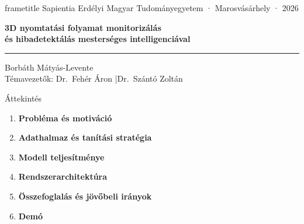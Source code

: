 \documentclass[aspectratio=169]{beamer}
\begin{document}
{
\begin{frame}[plain]
  \begin{beamercolorbox}[wd=\paperwidth,ht=1.3cm,dp=0pt,center]{frametitle}
    \vspace{0.35cm}
    {\small\color{white}
      Sapientia Erdélyi Magyar Tudományegyetem · Marosvásárhely · 2026}
  \end{beamercolorbox}

  \vspace{1.6cm}
  \centering
  {\LARGE\bfseries\color{primary}
    3D nyomtatási folyamat monitorizálás\\[0.45em]
    és hibadetektálás mesterséges intelligenciával}

  \vspace{0.9em}
  {\color{primary}\rule{9cm}{0.5pt}}
  \vspace{0.9em}

  {\large\color{black!75} Borbáth Mátyás-Levente}\\[0.5em]
  {\small\color{black!50}
    Témavezetők: Dr.~Fehér Áron \quad|\quad Dr.~Szántó Zoltán}
\end{frame}
}

\begin{frame}{Áttekintés}
  \vspace{0.6em}
  \centering
  \begin{minipage}{0.72\textwidth}
    \begin{enumerate}
      \setlength\itemsep{0.65em}
      \item \textbf{Probléma és motiváció}
      \item \textbf{Adathalmaz és tanítási stratégia}
      \item \textbf{Modell teljesítménye}
      \item \textbf{Rendszerarchitektúra}
      \item \textbf{Összefoglalás és jövőbeli irányok}
      \item \textbf{Demó}
    \end{enumerate}
  \end{minipage}
\end{frame}
\end{document}

